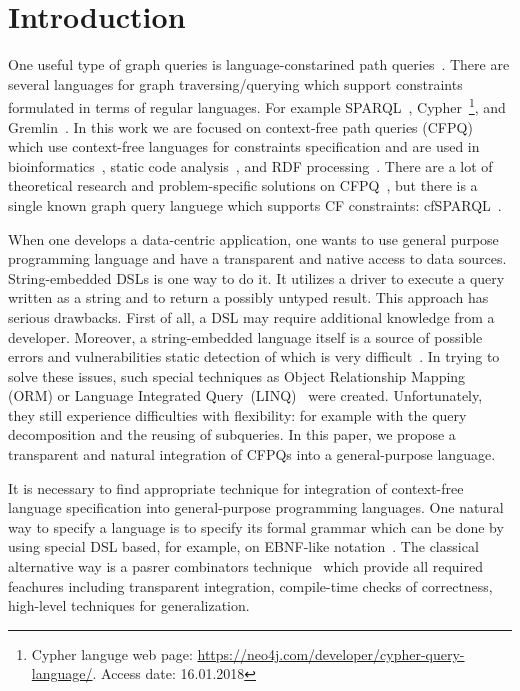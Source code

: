 \section{Introduction}

One useful type of graph queries is language-constarined path queries~\cite{FLCpathProblem}.
There are several languages for graph traversing/querying which support constraints formulated in terms of regular languages.
For example SPARQL~\cite{sparql}, Cypher~\footnote{Cypher languge web page: \url{https://neo4j.com/developer/cypher-query-language/}. Access date: 16.01.2018}, and Gremlin~\cite{gremlin}.
In this work we are focused on context-free path queries (CFPQ) which use context-free languages for constraints specification and are used in bioinformatics~\cite{GraphQueryWithEarley}, static code analysis~\cite{Reps, Zheng, LabelFlowCFLReachability, specificationCFLReachability, JavaCFL}, and RDF processing~\cite{CFGonRDF}. 
There are a lot of theoretical research and problem-specific solutions on CFPQ~\cite{Yannakakis, ConjCFPathQuery, Hellings16, QueryGraphWithData, RegularDBQuery, GraphQueryWithEarley, graphDB}, but there is a single known graph query languege which supports CF constraints: cfSPARQL~\cite{CFGonRDF}.

When one develops a data-centric application, one wants to use general purpose programming language and have a transparent and native access to data sources.
String-embedded DSLs is one way to do it. 
It utilizes a driver to execute a query written as a string and to return a possibly untyped result. 
This approach has serious drawbacks.
First of all, a DSL may require additional knowledge from a developer.
Moreover, a string-embedded language itself is a source of possible errors and vulnerabilities static detection of which is very difficult~\cite{stringEmbeddedLanguagesProblem}.  
In trying to solve these issues, such special techniques as Object Relationship Mapping (ORM) or Language Integrated Query~(LINQ)~\cite{LINQ1, LINQ2, LinqRDF} were created. Unfortunately, they still experience difficulties with flexibility: for example with the query decomposition and the reusing of subqueries.
In this paper, we propose a transparent and natural integration of CFPQs into a general-purpose language. 

It is necessary to find appropriate technique for integration of context-free language specification into general-purpose programming languages.
One natural way to specify a language is to specify its formal grammar which can be done by using special DSL based, for example, on EBNF-like notation~\cite{EBNFISO}.
The classical alternative way is a pasrer combinators technique~\cite{MonadicPArserCombinators} which provide all required feachures including transparent integration, compile-time checks of correctness, high-level techniques for generalization.

